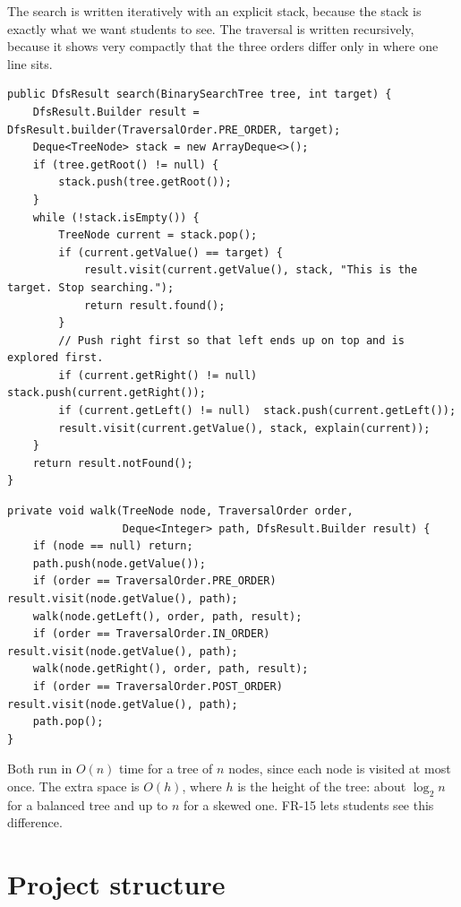 \documentclass[11pt,a4paper]{article}
\begin{document}
The search is written iteratively with an explicit stack, because the stack is exactly what we
want students to see. The traversal is written recursively, because it shows very compactly that
the three orders differ only in where one line sits.

\begin{lstlisting}[style=java, caption={DFS search (iterative, pre-order).}]
public DfsResult search(BinarySearchTree tree, int target) {
    DfsResult.Builder result = DfsResult.builder(TraversalOrder.PRE_ORDER, target);
    Deque<TreeNode> stack = new ArrayDeque<>();
    if (tree.getRoot() != null) {
        stack.push(tree.getRoot());
    }
    while (!stack.isEmpty()) {
        TreeNode current = stack.pop();
        if (current.getValue() == target) {
            result.visit(current.getValue(), stack, "This is the target. Stop searching.");
            return result.found();
        }
        // Push right first so that left ends up on top and is explored first.
        if (current.getRight() != null) stack.push(current.getRight());
        if (current.getLeft() != null)  stack.push(current.getLeft());
        result.visit(current.getValue(), stack, explain(current));
    }
    return result.notFound();
}
\end{lstlisting}

\begin{lstlisting}[style=java, caption={DFS traversal (recursive). Only the position of \texttt{visit} changes between orders.}]
private void walk(TreeNode node, TraversalOrder order,
                  Deque<Integer> path, DfsResult.Builder result) {
    if (node == null) return;
    path.push(node.getValue());
    if (order == TraversalOrder.PRE_ORDER)  result.visit(node.getValue(), path);
    walk(node.getLeft(), order, path, result);
    if (order == TraversalOrder.IN_ORDER)   result.visit(node.getValue(), path);
    walk(node.getRight(), order, path, result);
    if (order == TraversalOrder.POST_ORDER) result.visit(node.getValue(), path);
    path.pop();
}
\end{lstlisting}

Both run in $O(n)$ time for a tree of $n$ nodes, since each node is visited at most once. The extra
space is $O(h)$, where $h$ is the height of the tree: about $\log_2 n$ for a balanced tree and up
to $n$ for a skewed one. FR-15 lets students see this difference.

\section{Project structure}
\end{document}
